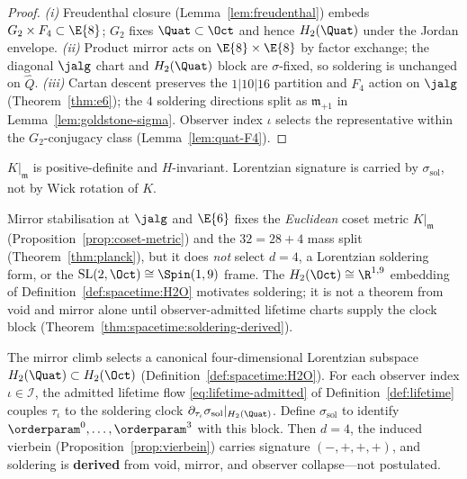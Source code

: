 \begin{proof}
\emph{(i)} Freudenthal closure (Lemma~\ref{lem:freudenthal}) embeds
$G_2\times F_4\subset\E{8}$; $G_2$ fixes $\Quat\subset\Oct$ and hence
$H_2(\Quat)$ under the Jordan envelope. \emph{(ii)} Product mirror acts on
$\E{8}\times\E{8}$ by factor exchange; the diagonal $\jalg$ chart and
$H_2(\Quat)$ block are $\sigma$-fixed, so soldering is unchanged on
$\hat Q$. \emph{(iii)} Cartan descent preserves the $1|10|16$ partition and
$F_4$ action on $\jalg$ (Theorem~\ref{thm:e6}); the $4$ soldering directions
split as $\mathfrak{m}_{+1}$ in Lemma~\ref{lem:goldstone-sigma}. Observer
index $\iota$ selects the representative within the $G_2$-conjugacy class
(Lemma~\ref{lem:quat-F4}).
\end{proof}

\begin{proposition}\label{prop:coset-metric}
$K|_{\mathfrak{m}}$ is positive-definite and $H$-invariant. Lorentzian
signature is carried by $\sigma_{\mathrm{sol}}$, not by Wick rotation of $K$.
\end{proposition}

\begin{proposition}\label{prop:coset-nogo}
Mirror stabilisation at $\jalg$ and $\E{6}$ fixes the \emph{Euclidean}
coset metric $K|_{\mathfrak{m}}$ (Proposition~\ref{prop:coset-metric}) and
the $32=28+4$ mass split (Theorem~\ref{thm:planck}), but it does \emph{not}
select $d=4$, a Lorentzian soldering form, or the
$\mathrm{SL}(2,\Oct)\cong\Spin(1,9)$ frame. The $H_2(\Oct)\cong\R^{1,9}$
embedding of Definition~\ref{def:spacetime:H2O} motivates soldering; it is
not a theorem from void and mirror alone until observer-admitted lifetime
charts supply the clock block (Theorem~\ref{thm:spacetime:soldering-derived}).
\end{proposition}

\begin{theorem}
\label{thm:spacetime:soldering-derived}
The mirror climb selects a canonical four-dimensional Lorentzian subspace
$H_2(\Quat)\subset H_2(\Oct)$ (Definition~\ref{def:spacetime:H2O}). For each
observer index $\iota\in\mathcal{I}$, the admitted lifetime flow
\eqref{eq:lifetime-admitted} of Definition~\ref{def:lifetime} couples
$\tau_\iota$ to the soldering clock
$\partial_{\tau_\iota}\sigma_{\mathrm{sol}}|_{H_2(\Quat)}$. Define
$\sigma_{\mathrm{sol}}$ to identify
$\orderparam^0,\ldots,\orderparam^3$ with this block. Then $d=4$, the
induced vierbein (Proposition~\ref{prop:vierbein}) carries signature
$(-,+,+,+)$, and soldering is \textbf{derived} from void, mirror, and
observer collapse---not postulated.
\end{theorem}

